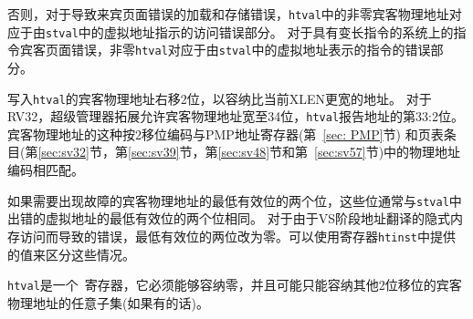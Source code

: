 否则，对于导致来宾页面错误的加载和存储错误，{\tt htval}中的非零宾客物理地址对应于由{\tt stval}中的虚拟地址指示的访问错误部分。
对于具有变长指令的系统上的指令宾客页面错误，非零{\tt htval}对应于由{\tt stval}中的虚拟地址表示的指令的错误部分。

\begin{commentary}
  写入{\tt htval}的宾客物理地址右移2位，以容纳比当前XLEN更宽的地址。
  对于RV32，超级管理器拓展允许宾客物理地址宽至34位，{\tt htval}报告地址的第33:2位。
  宾客物理地址的这种按2移位编码与PMP地址寄存器(第~\ref{sec: PMP}节)
  和页表条目(第\ref{sec:sv32}节，第\ref{sec:sv39}节，第\ref{sec:sv48}节和第~\ref{sec:sv57}节)中的物理地址编码相匹配。

如果需要出现故障的宾客物理地址的最低有效位的两个位，这些位通常与{\tt stval}中出错的虚拟地址的最低有效位的两个位相同。
对于由于VS阶段地址翻译的隐式内存访问而导致的错误，最低有效位的两位改为零。可以使用寄存器{\tt htinst}中提供的值来区分这些情况。
\end{commentary}

{\tt htval}是一个\warl\ 寄存器，它必须能够容纳零，并且可能只能容纳其他2位移位的宾客物理地址的任意子集(如果有的话)。


